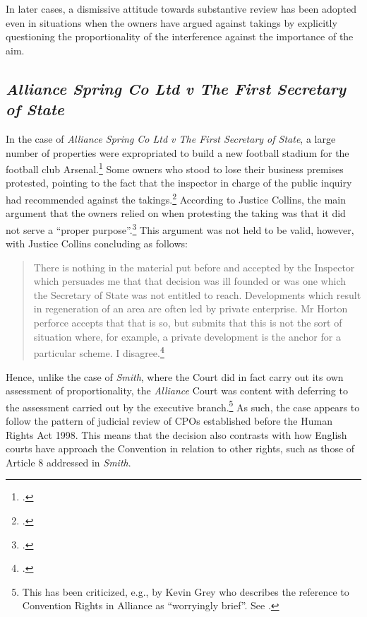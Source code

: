 In later cases, a dismissive attitude towards substantive review has been adopted even in situations when the owners have argued against takings by explicitly questioning the proportionality of the interference against the importance of the aim. 

\subsection{{\it Alliance Spring Co Ltd v The First Secretary of State}}

In the case of {\it Alliance Spring Co Ltd v The First Secretary of State}, a large number of properties were expropriated to build a new football stadium for the football club Arsenal.\footcite{alliance06} Some owners who stood to lose their business premises protested, pointing to the fact that the inspector in charge of the public inquiry had recommended against the takings.\footcite[6-7]{alliance06} According to Justice Collins, the main argument that the owners relied on when protesting the taking was that it did not serve a ``proper purpose''.\footcite[19]{alliance06} This argument was not held to be valid, however, with Justice Collins concluding as follows: 

\begin{quote}
There is nothing in the material put before and accepted by the Inspector which persuades me that that decision was ill founded or was one which the Secretary of State was not entitled to reach. Developments which result in regeneration of an area are often led by private enterprise. Mr Horton perforce accepts that that is so, but submits that this is not the sort of situation where, for example, a private development is the anchor for a particular scheme. I disagree.\footcite[19]{alliance06}
\end{quote}

Hence, unlike the case of {\it Smith}, where the Court did in fact carry out its own assessment of proportionality, the {\it Alliance} Court was content with deferring to the assessment carried out by the executive branch.\footnote{This has been criticized, e.g., by Kevin Grey who describes the reference to Convention Rights in Alliance as ``worryingly brief''. See \cite{gray11}.} As such, the case appears to follow the pattern of judicial review of CPOs established before the Human Rights Act 1998. This means that the decision also contrasts with how English courts have approach the Convention in relation to other  rights, such as those of Article 8 addressed in {\it Smith}.

